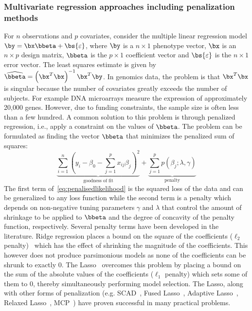 \documentclass[12pt,letterpaper]{article}
\begin{document}
\subsubsection{Multivariate regression approaches including penalization methods} \label{sec:pen}
For $n$ observations and $p$ covariates, consider the multiple linear regression model \mbox{$\by = \bx \bbeta + \bs{\varepsilon}$}, where $\by$ is a $n \times 1$ phenotype vector,  $\bx$ is an $n \times p$ design matrix, $\bbeta$ is the $p \times 1$ coefficient vector and $\bs{\varepsilon}$ is the $n \times 1$ error vector. 
The least squares estimate is given by $ \widehat{\bbeta} = \left( \bx^T \bx  \right)^{-1} \bx^T \by $. In genomics data, the problem is that $\bx^T \bx$ is singular because the number of covariates greatly exceeds the number of subjects. 
For example DNA microarrays measure the expression of approximately 20,000 genes. 
However, due to funding constraints, the sample size is often less than a few hundred. 
A common solution to this problem is through penalized regression, i.e., apply a constraint on the values of $\bbeta$. The problem can be formulated as finding the vector $\bbeta$ that minimizes the penalized sum of squares:
\begin{equation}
\underbrace{\sum\limits_{i=1}^{n} \left( y_i - \beta_0 - \sum\limits_{j=1}^{p}x_{ij}\beta_j \right)^2}_{\textrm{goodness of fit}} +  \underbrace{\sum\limits_{j=1}^{p} p(\beta_j;\lambda, \gamma)}_{\textrm{penalty}} \label{eq:penalisedlikelihood}
\end{equation}
The first term of~\eqref{eq:penalisedlikelihood} is the squared loss of the data and can be generalized to any loss function while the second term is a penalty which depends on non-negative tuning parameters $\gamma$ and $\lambda$ that control the amount of shrinkage to be applied to $\bbeta$ and the degree of concavity of the penalty function, respectively. 
Several penalty terms have been developed in the literature. Ridge regression places a bound on the square of the coefficients ($\ell_2$ penalty)~\citep{hoerl1970ridge} which has the effect of shrinking the magnitude of the coefficients. 
This however does not produce parsimonious models as none of the coefficients can be shrunk to exactly 0. The Lasso~\citep{tibshirani1996regression} overcomes this problem by placing a bound on the sum of the absolute values of the coefficients ($\ell_1$ penalty) which sets some of them to 0, thereby simultaneously performing model selection. The Lasso, along with other forms of penalization (e.g. SCAD~\cite{fan2001variable}, Fused Lasso~\citep{tibshirani2005sparsity}, Adaptive Lasso~\citep{zou2006adaptive}, Relaxed Lasso~\citep{meinshausen2007relaxed}, MCP~\citep{zhang2010nearly}) have proven successful in many practical problems.
\end{document}
